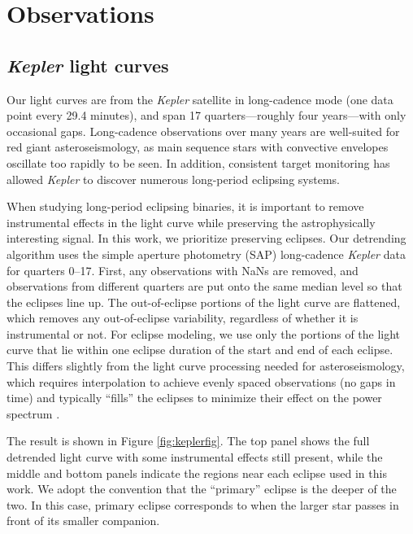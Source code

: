 \section{Observations}\label{data}

\subsection{\emph{Kepler} light curves}\label{kepler}
Our light curves are from the \emph{Kepler} satellite in long-cadence mode (one data point every 29.4 minutes), and span 17 quarters---roughly four years---with only occasional gaps. Long-cadence observations over many years are well-suited for red giant asteroseismology, as main sequence stars with convective envelopes oscillate too rapidly to be seen. In addition, consistent target monitoring has allowed \emph{Kepler} to discover numerous long-period eclipsing systems.

When studying long-period eclipsing binaries, it is important to remove instrumental effects in the light curve while preserving the astrophysically interesting signal. In this work, we prioritize preserving eclipses. Our detrending algorithm uses the simple aperture photometry (SAP) long-cadence \emph{Kepler} data for quarters 0--17. First, any observations with NaNs are removed, and observations from different quarters are put onto the same median level so that the eclipses line up. The out-of-eclipse portions of the light curve are flattened, which removes any out-of-eclipse variability, regardless of whether it is instrumental or not. For eclipse modeling, we use only the portions of the light curve that lie within one eclipse duration of the start and end of each eclipse. This differs slightly from the light curve processing needed for asteroseismology, which requires interpolation to achieve evenly spaced observations (no gaps in time) and typically ``fills'' the eclipses to minimize their effect on the power spectrum \citep{gau14}.

The result is shown in Figure \ref{fig:keplerfig}. The top panel shows the full detrended light curve with some instrumental effects still present, while the middle and bottom panels indicate the regions near each eclipse used in this work. We adopt the convention that the ``primary'' eclipse is the deeper of the two. In this case, primary eclipse corresponds to when the larger star passes in front of its smaller companion.
